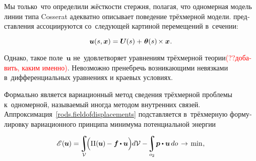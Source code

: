 \begin{otherlanguage}{russian}

Мы только~что определили жёсткости стержня, полагая, что одномерная модель линии типа Cosserat адекватно описывает поведение трёхмерной модели.
 представления ассоциируются со~следующей картиной перемещений в~сечении:

\nopagebreak\vspace{-0.1em}\begin{equation}\label{rods.fieldofdisplacements}
\bm{u}(s,\bm{x}) = \bm{U}\hspace{-0.1ex}(s) + \hspace{.15ex} \bm{\theta}(s) \hspace{-0.2ex} \times \bm{x}
\hspace{.1ex} .
\end{equation}

\vspace{-0.1em}\noindent
Однако, такое поле~$\bm{u}$ не~удовлетворяет уравнениям трёхмерной теории\textcolor{red}{(??добавить, каким именно)}.
Невозможно пренебречь возникающими невязками в~дифференциальных уравнениях и краевых условиях.

Формально  является вариационный метод сведения трёхмерной проблемы к~одномерной, называемый иногда методом внутренних связей.
Аппроксимация~\eqref{rods.fieldofdisplacements} подставляется в~трёхмерную формулировку вариационного принципа минимума потенциальной энергии~

\nopagebreak\vspace{-0.1em}\begin{equation*}
\potentialenergyfunctional \hspace{.2ex} (\hspace{-0.1ex}\bm{u}\hspace{-0.1ex}) = \hspace{-0.2ex}
\displaystyle\integral\displaylimits_{\mathcal{V}} \hspace{-0.5ex}
\Bigl(
\potential(\hspace{-0.1ex}\bm{u}\hspace{-0.1ex}) \hspace{-0.1ex} - \bm{f} \hspace{-0.1ex} \dotp \bm{u} \Bigr) \hspace{-0.1ex} d\mathcal{V}
- \hspace{-0.3ex}
\displaystyle\integral\displaylimits_{o_2} \hspace{-0.32ex} \bm{p} \dotp \bm{u} \hspace{.33ex} do \hspace{.2ex}
\hspace{.1ex}\to\hspace{.25ex} \mathrm{min}
\hspace{.1ex} ,
\end{equation*}


\end{otherlanguage}
